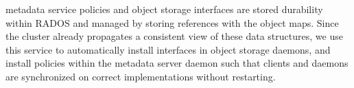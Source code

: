  metadata service policies and object
storage interfaces are stored durability within RADOS and managed by storing
references with the object maps. Since the cluster already propagates a
consistent view of these data structures, we use this service to automatically
install interfaces in object storage daemons, and install policies within the metadata server
daemon such that clients and daemons are synchronized on
correct implementations without restarting.

 
